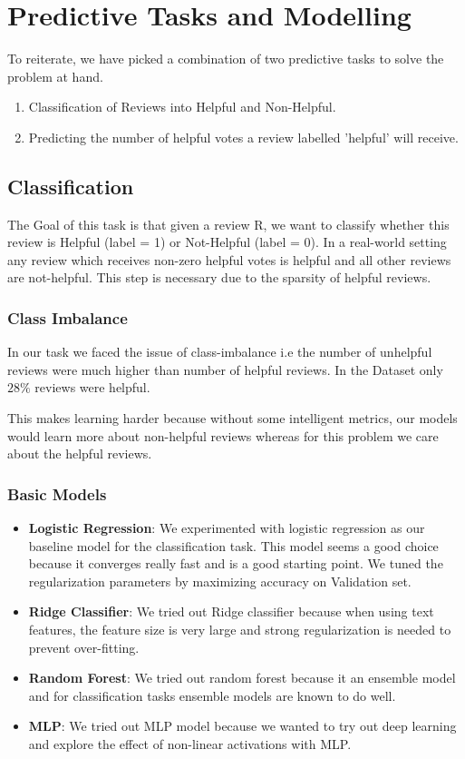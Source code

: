 \documentclass[final]{cvpr}
\begin{document}
\section{Predictive Tasks and Modelling}
To reiterate, we have picked a combination of two predictive tasks to solve the problem at hand.
\begin{enumerate}
    \item Classification of Reviews into Helpful and Non-Helpful.
    \item Predicting the number of helpful votes a review labelled 'helpful' will receive.
\end{enumerate}

\subsection{Classification}
The Goal of this task is that given a review R, we want to classify whether this review is Helpful (label = 1) or Not-Helpful (label = 0). In a real-world setting any review which receives non-zero helpful votes is helpful and all other reviews are not-helpful. This step is necessary due to the sparsity of helpful reviews.

\subsubsection{Class Imbalance}
In our task we faced the issue of class-imbalance i.e the number of unhelpful reviews were much higher than number of helpful reviews.
In the Dataset only $28\%$ reviews were helpful. 

This makes learning harder because without some intelligent metrics, our models would learn more about non-helpful reviews whereas for this problem we care about the helpful reviews.

\subsubsection{Basic Models}
\begin{itemize}
    \item \textbf{Logistic Regression}: We experimented with logistic regression as our baseline model for the classification task. This model seems a good choice because it converges really fast and is a good starting point. We tuned the regularization parameters by maximizing accuracy on Validation set.
    \item \textbf{Ridge Classifier}: We tried out Ridge classifier because when using text features, the feature size is very large and strong regularization is needed to prevent over-fitting.
    \item \textbf{Random Forest}: We tried out random forest because it an ensemble model and for classification tasks ensemble models are known to do well.
    \item \textbf{MLP}: We tried out MLP model because we wanted to try out deep learning and explore the effect of non-linear activations with MLP.
\end{itemize}
\end{document}
